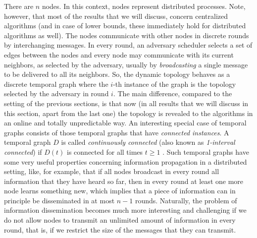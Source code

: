\documentclass[oribibl, 11pt]{llncs}
\begin{document}
There are $n$ nodes. In this context, nodes represent distributed processes. Note, however, that most of the results that we will discuss, concern centralized algorithms (and in case of lower bounds, these immediately hold for distributed algorithms as well). The nodes communicate with other nodes in discrete rounds by interchanging messages. In every round, an adversary scheduler selects a set of edges between the nodes and every node may communicate with its current neighbors, as selected by the adversary, usually by \emph{broadcasting} a single message to be delivered to all its neighbors. So, the dynamic topology behaves as a discrete temporal graph where the $i$-th instance of the graph is the topology selected by the adversary in round $i$. The main difference, compared to the setting of the previous sections, is that now (in all results that we will discuss in this section, apart from the last one) the topology is revealed to the algorithms in an online and totally unpredictable way. An interesting special case of temporal graphs consists of those temporal graphs that have \emph{connected instances}. A temporal graph $D$ is called \emph{continuously connected} (also known as \emph{1-interval connected}) if $D(t)$ is connected for all times $t\geq 1$ \cite{OW05,KLO10}. Such temporal graphs have some very useful properties concerning information propagation in a distributed setting, like, for example, that if all nodes broadcast in every round all information that they have heard so far, then in every round at least one more node learns something new, which implies that a piece of information can in principle be disseminated in at most $n-1$ rounds. Naturally, the problem of information dissemination becomes much more interesting and challenging if we do not allow nodes to transmit an unlimited amount of information in every round, that is, if we restrict the size of the messages that they can transmit.
\end{document}
